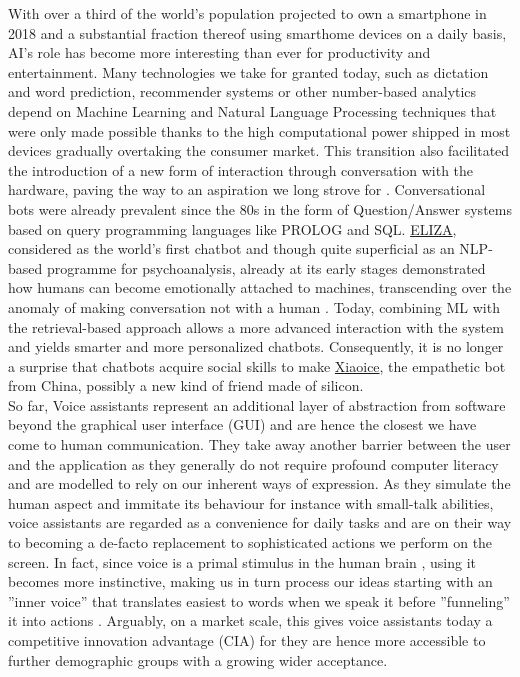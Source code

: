 With over a third of the world's population projected to own a smartphone in 2018 \cite{statistasmartphones} and a substantial fraction thereof using smarthome devices on a daily basis, AI's role has become more interesting than ever for productivity and entertainment.
Many technologies we take for granted today, such as dictation and word prediction, recommender systems or other number-based analytics depend on Machine Learning and Natural Language Processing techniques that were only made possible thanks to the high computational power shipped in most devices gradually overtaking the consumer market.
This transition also facilitated the introduction of a new form of interaction through conversation with the hardware, paving the way to an aspiration we long strove for \cite{Starwars}.
Conversational bots were already prevalent since the 80s in the form of Question/Answer systems based on query programming languages like PROLOG and SQL.
\href{https://en.wikipedia.org/wiki/ELIZA}{ELIZA}, considered as the world's first chatbot and though quite superficial as an NLP-based programme for psychoanalysis, already at its early stages demonstrated how humans can become emotionally attached to machines, transcending over the anomaly of making conversation not with a human \cite{Weizenbaum1976}.
Today, combining ML with the retrieval-based approach allows a more advanced interaction with the system and yields smarter and more personalized chatbots.
Consequently, it is no longer a surprise that chatbots acquire social skills to make \href{https://en.wikipedia.org/wiki/Xiaoice}{Xiaoice}, the empathetic bot from China, possibly a new kind of friend made of silicon.\\ 

So far, Voice assistants represent an additional layer of abstraction from software beyond the graphical user interface (GUI) and are hence the closest we have come to human communication.
They take away another barrier between the user and the application as they generally do not require profound computer literacy and are modelled to rely on our inherent ways of expression.
As they simulate the human aspect and immitate its behaviour for instance with small-talk abilities\cite{hiddenbrainpod}, voice assistants are regarded as a convenience for daily tasks and are on their way to becoming a de-facto replacement to sophisticated actions we perform on the screen.
In fact, since voice is a primal stimulus in the human brain \cite{voiceneurons}, using it becomes more instinctive, making us in turn process our ideas starting with an ''inner voice'' that translates easiest to words when we speak it before ''funneling'' it into actions \cite{alexapc18}.
Arguably, on a market scale, this gives voice assistants today a competitive innovation advantage (CIA) for they are hence more accessible to further demographic groups with a growing wider acceptance.\\

